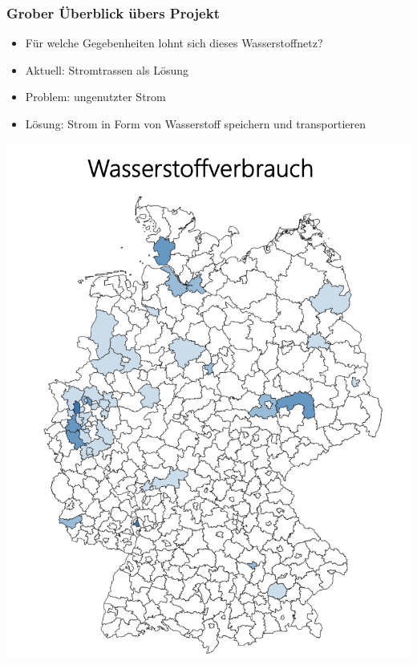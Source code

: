 \documentclass[aspectratio=169,t]{beamer}
\begin{document}
\begin{frame}
\begin{minipage}{1\linewidth}
\begin{minipage}{.5\linewidth}
\end{minipage}
\end{minipage}	
		
			
		
	\end{frame}


	\begin{frame}
		\frametitle{Grober Überblick übers Projekt}
		\vspace*{-4mm}
		\begin{minipage}{1\linewidth}
			\begin{minipage}{.5\linewidth}
				\vspace*{-12mm}
				
				\begin{itemize}
					
					\item Für welche Gegebenheiten lohnt sich dieses Wasserstoffnetz?
						\vspace*{2mm}
					
					\item Aktuell: Stromtrassen als Lösung
						\vspace*{2mm}
					
					\item Problem: ungenutzter Strom 
						\vspace*{2mm}
					
					\item Lösung: Strom in Form von Wasserstoff speichern und transportieren 
					
					
				\end{itemize}
			\end{minipage}
			\hfill
			\begin{minipage}{.5\linewidth}
				\centering
				\includegraphics[width=.7\linewidth]{h2.png}
				
			\end{minipage}
		\end{minipage}
		
		
		
	\end{frame}
	
\end{document}

